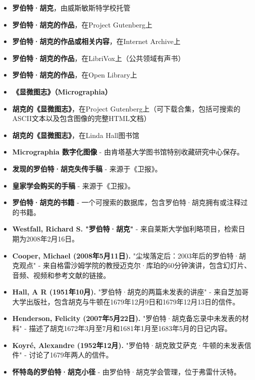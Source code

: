 \begin{itemize}
\item \textbf{罗伯特·胡克}，由威斯敏斯特学校托管  
\item \textbf{罗伯特·胡克的作品}，在Project Gutenberg上  
\item \textbf{罗伯特·胡克的作品或相关内容}，在Internet Archive上  
\item \textbf{罗伯特·胡克的作品}，在LibriVox上（公共领域有声书）  
\item \textbf{罗伯特·胡克的作品}，在Open Library上  
\item \textbf{《显微图志》（Micrographia）}  
\item \textbf{胡克的《显微图志》}，在Project Gutenberg上（可下载合集，包括可搜索的ASCII文本以及包含图像的完整HTML文档）  
\item \textbf{胡克的《显微图志》}，在Linda Hall图书馆
\item \textbf{Micrographia 数字化图像} - 由肯塔基大学图书馆特别收藏研究中心保存。
\item \textbf{发现的罗伯特·胡克失传手稿} - 来源于《卫报》。
\item \textbf{皇家学会购买的手稿} - 来源于《卫报》。
\item \textbf{罗伯特·胡克的书籍} - 一个可搜索的数据库，包含罗伯特·胡克拥有或注释过的书籍。
\item \textbf{Westfall, Richard S. "罗伯特·胡克"} - 来自莱斯大学伽利略项目，检索日期为2008年2月16日。
\item \textbf{Cooper, Michael (2008年5月11日).} "尘埃落定后：2003年后的罗伯特·胡克观点" - 来自格雷沙姆学院的教授迈克尔·库珀的60分钟演讲，包含幻灯片、音频、视频和参考文献的链接。
\item \textbf{Hall, A R (1951年10月).} "罗伯特·胡克的两篇未发表的讲座" - 来自芝加哥大学出版社，包含胡克与牛顿在1679年12月9日和1679年12月13日的信件。
\item \textbf{Henderson, Felicity (2007年5月22日).} "罗伯特·胡克备忘录中未发表的材料" - 描述了胡克1672年3月至7月和1681年1月至1683年5月的日记内容。
\item \textbf{Koyré, Alexandre (1952年12月).} "罗伯特·胡克致艾萨克·牛顿的未发表信件" - 讨论了1679年两人的信件。
\item \textbf{怀特岛的罗伯特·胡克小径} - 由罗伯特·胡克学会管理，位于弗雷什沃特。
\end{itemize}